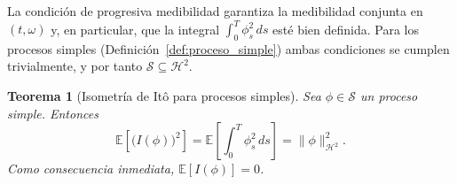 \documentclass[11pt,a4paper,oneside]{report}
\theoremstyle{plain}
\newtheorem{teorema}{Teorema}[chapter]
\theoremstyle{definition}
\theoremstyle{remark}
\newcommand{\E}{\mathbb{E}}
\newcommand{\1}{\mathbf{1}}
\begin{document}
La condición de progresiva medibilidad garantiza la medibilidad
conjunta en $(t, \omega)$ y, en particular, que la integral
$\int_0^T \phi_s^2\, ds$ esté bien definida. Para los procesos
simples (Definición~\ref{def:proceso_simple}) ambas condiciones se
cumplen trivialmente, y por tanto $\mathcal{S} \subseteq
\mathcal{H}^2$.

\begin{teorema}[Isometría de Itô para procesos simples]
\label{teo:isometria_ito_simples}
Sea $\phi \in \mathcal{S}$ un proceso simple. Entonces
\begin{equation}\label{eq:isometria_ito_simples}
  \E\!\left[\bigl(I(\phi)\bigr)^2\right]
  = \E\!\left[\int_0^T \phi_s^2\, ds\right]
  = \|\phi\|_{\mathcal{H}^2}^2.
\end{equation}
Como consecuencia inmediata, $\E[I(\phi)] = 0$.
\end{teorema}
\end{document}
